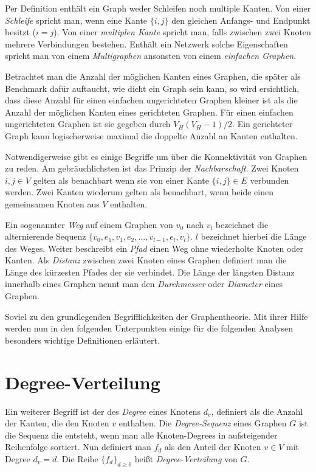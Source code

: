 \documentclass[a4paper,ngerman,oneside,titlepage,bibliography=totoc,11pt]{scrreprt}
\begin{document}
Per Definition enthält ein Graph weder Schleifen noch multiple Kanten. Von einer \emph{Schleife} spricht man, wenn eine Kante $\{i,j\}$ den gleichen Anfangs- und Endpunkt besitzt ($i = j$). Von einer \emph{multiplen Kante} spricht man, falls zwischen zwei Knoten mehrere Verbindungen bestehen. Enthält ein Netzwerk solche Eigenschaften spricht man von einem \emph{Multigraphen} ansonsten von einem \emph{einfachen Graphen}.

Betrachtet man die Anzahl der möglichen Kanten eines Graphen, die später als Benchmark dafür auftaucht, wie dicht ein Graph sein kann, so wird ersichtlich, dass diese Anzahl für einen einfachen ungerichteten Graphen kleiner ist als die Anzahl der möglichen Kanten eines gerichteten Graphen. Für einen einfachen ungerichteten Graphen ist sie gegeben durch $V_H(V_H-1)/2$. Ein gerichteter Graph kann logischerweise maximal die doppelte Anzahl an Kanten enthalten.

Notwendigerweise gibt es einige Begriffe um über die Konnektivität von Graphen zu reden. Am gebräuchlichsten ist das Prinzip der \emph{Nachbarschaft}. Zwei Knoten $ i,j \in V$ gelten als benachbart wenn sie von einer Kante $\{i,j\} \in E$ verbunden werden. Zwei Kanten wiederum gelten als benachbart, wenn beide einen gemeinsamen Knoten aus $V$ enthalten.

Ein sogenannter \emph{Weg} auf einem Graphen von $v_0$ nach $v_l$ bezeichnet die alternierende Sequenz $\{v_0, e_1, v_1, e_2, ..., v_{l-1}, e_l, v_l\}$. $l$ bezeichnet hierbei die Länge des Weges. Weiter beschreibt ein \emph{Pfad} einen Weg ohne wiederholte Knoten oder Kanten. Als \emph{Distanz} zwischen zwei Knoten eines Graphen definiert man die Länge des kürzesten Pfades der sie verbindet. Die Länge der längsten Distanz innerhalb eines Graphen nennt man den \emph{Durchmesser} oder \emph{Diameter} eines Graphen.

Soviel zu den grundlegenden Begrifflichkeiten der Graphentheorie. Mit ihrer Hilfe werden nun in den folgenden Unterpunkten einige für die folgenden Analysen besonders wichtige Definitionen erläutert.

\section{Degree-Verteilung}
Ein weiterer Begriff ist der des \emph{Degree} eines Knotens $d_v$, definiert als die Anzahl der Kanten, die den Knoten $v$ enthalten. Die \emph{Degree-Sequenz} eines Graphen $G$ ist die Sequenz die entsteht, wenn man alle Knoten-Degrees in aufsteigender Reihenfolge sortiert. Nun definiert man $f_d$ als den Anteil der Knoten $v \in V$ mit Degree $d_v = d$. Die Reihe $\{f_d\}_{d \geq 0}$ heißt \emph{Degree-Verteilung} von $G$. 
\end{document}
